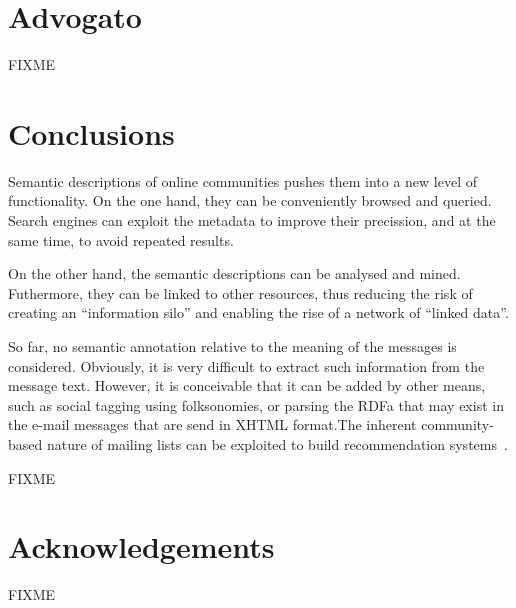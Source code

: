 \documentclass{../templates/www2008-submission}
\begin{document}
\section{Advogato}

FIXME


\section{\label{sec:conclusions}Conclusions}

Semantic descriptions of online communities pushes them
into a new level of functionality. On the one hand, they can be
conveniently browsed and queried. Search engines can exploit the
metadata to improve their precission, and at the same time, to
avoid repeated results.

On the other hand, the semantic descriptions can be
analysed and mined. Futhermore, they can be linked to other resources,
thus reducing the risk of creating an ``information silo'' and
enabling the rise of a network of ``linked data''.

So far, no semantic annotation relative to the meaning of
the messages is considered. Obviously, it is very difficult
to extract such information from the message text.
However, it is conceivable that it can be added by other 
means, such as social tagging using folksonomies, or parsing the 
RDFa that may exist in the e-mail messages that are send in XHTML 
format.The inherent community-based nature of mailing lists can
be exploited to build recommendation systems~\cite{Celma2006}.

FIXME

\section*{Acknowledgements}

FIXME





\balancecolumns
\end{document}
